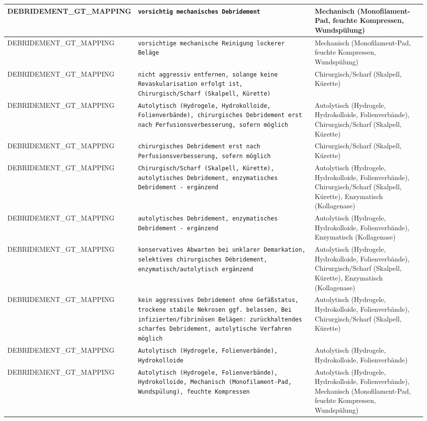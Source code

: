 \begin{longtable}{|p{3.5cm}|p{5cm}|p{6.5cm}|}
DEBRIDEMENT\_GT\_MAPPING & \texttt{vorsichtig mechanisches Debridement} & Mechanisch (Monofilament-Pad, feuchte Kompressen, Wundspülung) \\ \hline
DEBRIDEMENT\_GT\_MAPPING & \texttt{vorsichtige mechanische Reinigung lockerer Beläge} & Mechanisch (Monofilament-Pad, feuchte Kompressen, Wundspülung) \\ \hline
DEBRIDEMENT\_GT\_MAPPING & \texttt{nicht aggressiv entfernen, solange keine Revaskularisation erfolgt ist, Chirurgisch/Scharf (Skalpell, Kürette)} & Chirurgisch/Scharf (Skalpell, Kürette) \\ \hline
DEBRIDEMENT\_GT\_MAPPING & \texttt{Autolytisch (Hydrogele, Hydrokolloide, Folienverbände), chirurgisches Debridement erst nach Perfusionsverbesserung, sofern möglich} & Autolytisch (Hydrogele, Hydrokolloide, Folienverbände), Chirurgisch/Scharf (Skalpell, Kürette) \\ \hline
DEBRIDEMENT\_GT\_MAPPING & \texttt{chirurgisches Debridement erst nach Perfusionsverbesserung, sofern möglich} & Chirurgisch/Scharf (Skalpell, Kürette) \\ \hline
DEBRIDEMENT\_GT\_MAPPING & \texttt{Chirurgisch/Scharf (Skalpell, Kürette), autolytisches Debridement, enzymatisches Debridement - ergänzend} & Autolytisch (Hydrogele, Hydrokolloide, Folienverbände), Chirurgisch/Scharf (Skalpell, Kürette), Enzymatisch (Kollagenase) \\ \hline
DEBRIDEMENT\_GT\_MAPPING & \texttt{autolytisches Debridement, enzymatisches Debridement - ergänzend} & Autolytisch (Hydrogele, Hydrokolloide, Folienverbände), Enzymatisch (Kollagenase) \\ \hline
DEBRIDEMENT\_GT\_MAPPING & \texttt{konservatives Abwarten bei unklarer Demarkation, selektives chirurgisches Débridement, enzymatisch/autolytisch ergänzend} & Autolytisch (Hydrogele, Hydrokolloide, Folienverbände), Chirurgisch/Scharf (Skalpell, Kürette), Enzymatisch (Kollagenase) \\ \hline
DEBRIDEMENT\_GT\_MAPPING & \texttt{kein aggressives Debridement ohne Gefäßstatus, trockene stabile Nekrosen ggf. belassen, Bei infizierten/fibrinösen Belägen: zurückhaltendes scharfes Debridement, autolytische Verfahren möglich} & Autolytisch (Hydrogele, Hydrokolloide, Folienverbände), Chirurgisch/Scharf (Skalpell, Kürette) \\ \hline
DEBRIDEMENT\_GT\_MAPPING & \texttt{Autolytisch (Hydrogele, Folienverbände), Hydrokolloide} & Autolytisch (Hydrogele, Hydrokolloide, Folienverbände) \\ \hline
DEBRIDEMENT\_GT\_MAPPING & \texttt{Autolytisch (Hydrogele, Folienverbände), Hydrokolloide, Mechanisch (Monofilament-Pad, Wundspülung), feuchte Kompressen} & Autolytisch (Hydrogele, Hydrokolloide, Folienverbände), Mechanisch (Monofilament-Pad, feuchte Kompressen, Wundspülung) \\ \hline

\end{longtable}
